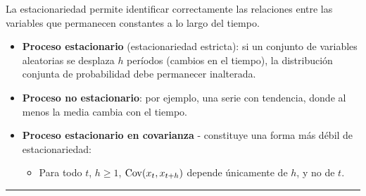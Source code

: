 \begin{f}[Estacionariedad]
	
	La estacionariedad permite identificar correctamente las relaciones entre las variables que permanecen constantes a lo largo del tiempo.
	
	\begin{itemize}[leftmargin=*]
		\item \textbf{Proceso estacionario} (estacionariedad estricta): si un conjunto de variables aleatorias se desplaza \(h\) períodos (cambios en el tiempo), la distribución conjunta de probabilidad debe permanecer inalterada.
		
		\item \textbf{Proceso no estacionario}: por ejemplo, una serie con tendencia, donde al menos la media cambia con el tiempo.
		
		\item \textbf{Proceso estacionario en covarianza} - constituye una forma más débil de estacionariedad:
		
		\begin{itemize}[leftmargin=*]
			
			\item Para todo \(t\), \(h \geq 1\), \(\mathrm{Cov}(x_{t},x_{t+h})\) depende únicamente de \(h\), y no de \(t\).
		\end{itemize}
	\end{itemize}
	
\end{f}  \hrule

